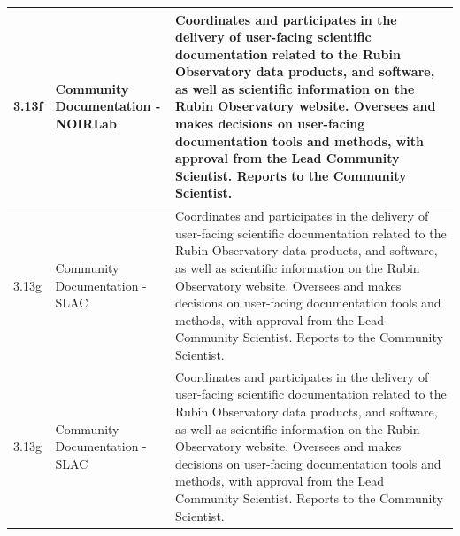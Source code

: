 \begin{longtable} {|p{}|p{}|p{}|}
{3.13f}&{Community Documentation - NOIRLab}&{Coordinates and participates in the delivery of user-facing scientific documentation related to the Rubin Observatory data products, and software, as well as scientific information on the Rubin Observatory website.  Oversees and makes decisions on user-facing documentation tools and methods, with approval from the Lead Community Scientist. Reports to the Community Scientist.} \\ \hline
{3.13g}&{Community Documentation - SLAC}&{Coordinates and participates in the delivery of user-facing scientific documentation related to the Rubin Observatory data products, and software, as well as scientific information on the Rubin Observatory website.  Oversees and makes decisions on user-facing documentation tools and methods, with approval from the Lead Community Scientist. Reports to the Community Scientist.} \\ \hline
{3.13g}&{Community Documentation - SLAC}&{Coordinates and participates in the delivery of user-facing scientific documentation related to the Rubin Observatory data products, and software, as well as scientific information on the Rubin Observatory website.  Oversees and makes decisions on user-facing documentation tools and methods, with approval from the Lead Community Scientist. Reports to the Community Scientist.} \\ \hline
\end{longtable} \normalsize
